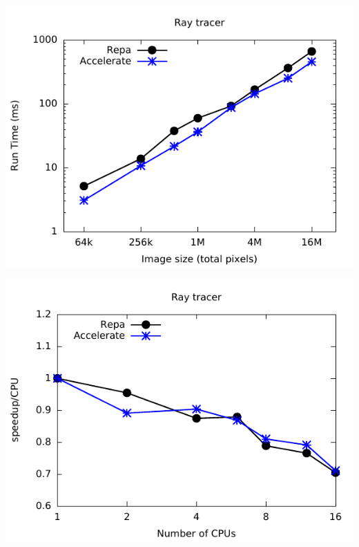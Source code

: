 \documentclass[14pt]{beamer}\beamertemplatenavigationsymbolsempty
\begin{document}
\begin{frame}
\includegraphics[width=\textwidth]{images/benchmarks/ray/ray}
\end{frame}

\begin{frame}
\includegraphics[width=\textwidth]{images/benchmarks/ray/ray-scale}
\end{frame}
\end{document}
